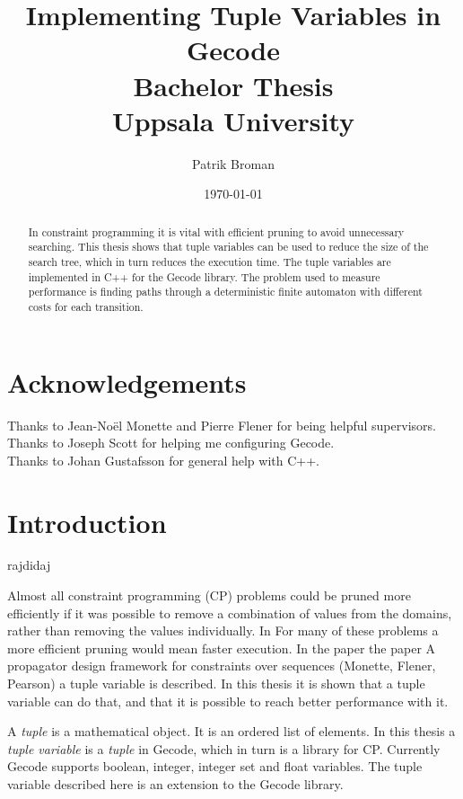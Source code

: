 \documentclass[a4paper,11pt]{article}
\title{\textbf{Implementing Tuple Variables in Gecode\\
	Bachelor Thesis \\
    Uppsala University  \\
  }
}
\author{Patrik Broman}
\date{\today}
\begin{document}
\maketitle

\begin{abstract}

In constraint programming it is vital with efficient pruning to avoid unnecessary searching. This thesis shows that tuple variables can be used to reduce the size of the search tree, which in turn reduces the execution time. The tuple variables are implemented in C++ for the Gecode library. The problem used to measure performance is finding paths through a deterministic finite automaton with different costs for each transition.
\end{abstract}

\setcounter{tocdepth}{2}
\tableofcontents

\section*{Acknowledgements}
Thanks to Jean-No\"{e}l Monette and Pierre Flener for being helpful supervisors. \\
Thanks to Joseph Scott for helping me configuring Gecode. \\
Thanks to Johan Gustafsson for general help with C++. \\

\section{Introduction}
\cite{bitvector} rajdidaj \cite{mpg}

Almost all constraint programming (CP) problems could be pruned more efficiently if it was possible to remove a combination of values from the domains, rather than removing the values individually. In  For many of these problems a more efficient pruning would mean faster execution. In the paper the paper A propagator design framework for constraints over sequences (Monette, Flener, Pearson) a tuple variable is described. In this thesis it is shown that a tuple variable can do that, and that it is possible to reach better performance with it. 

A \textit{tuple} is a mathematical object. It is an ordered list of elements. In this thesis a \textit{tuple variable} is a \textit{tuple} in Gecode, which in turn is a library for CP. Currently Gecode supports boolean, integer, integer set and float variables. The tuple variable described here is an extension to the Gecode library.
\end{document}
